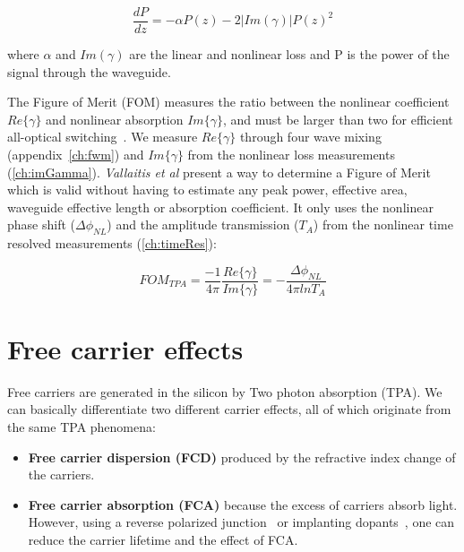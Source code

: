 \begin{equation}
 \frac{dP}{dz} = -\alpha P(z) - 2|Im(\gamma)| P(z)^2 
\label{eq:differentialTPAImGamma}
\end{equation}

where $\alpha$ and $Im(\gamma)$ are the linear and nonlinear loss and P is the power of the signal through the waveguide.

The Figure of Merit (FOM) measures the ratio between the nonlinear coefficient $Re\{\gamma\}$ and nonlinear absorption $Im\{\gamma\}$, and must be larger than two for efficient all-optical switching~\cite{Vallaitis2009,Delong1989,Mizrahi}.
We measure $Re\{\gamma\}$ through four wave mixing (appendix~\ref{ch:fwm}) and $Im\{\gamma\}$ from the nonlinear loss measurements (\ref{ch:imGamma}).
\textit{Vallaitis et al} present a way to determine a Figure of Merit which is valid without having to estimate any peak power, effective area, waveguide effective length or absorption coefficient. It only uses the nonlinear phase shift ($\Delta\phi_{NL}$) and the amplitude transmission ($T_A$) from the nonlinear time resolved measurements (\ref{ch:timeRes}):


\begin{equation} 
FOM_{TPA}=\frac{-1}{4\pi} \frac{Re\{\gamma\}}{Im\{\gamma\}} = -\frac{\Delta\phi_{NL}}{4\pi lnT_A}
\label{eq:fom}
\end{equation}


\section{Free carrier effects}
Free carriers are generated in the silicon by Two photon absorption (TPA).
We can basically differentiate two different carrier effects, all of which originate from the same TPA phenomena:

\begin{itemize}
\item \textbf{Free carrier dispersion (FCD)} produced by the refractive index change of the carriers. 

\item \textbf{Free carrier absorption (FCA)} because the excess of carriers absorb light. 
However, using a reverse polarized junction~\cite{Turner-Foster2010} or implanting dopants~\cite{Liu2006}, one can reduce the carrier lifetime and the effect of FCA.
\end{itemize}

